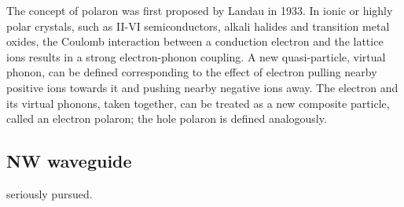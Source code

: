 The concept of polaron was first proposed by Landau in 1933. In ionic or highly polar crystals, such as II-VI semiconductors, alkali halides and transition metal oxides, the Coulomb interaction between a conduction electron and the lattice ions results in a strong electron-phonon coupling. A new quasi-particle, virtual phonon, can be defined corresponding to the effect of electron pulling nearby positive ions towards it and pushing nearby negative ions away. The electron and its virtual phonons, taken together, can be treated as a new composite particle, called an electron polaron; the hole polaron is defined analogously. \cite{Devreese1996}

\subsection{NW waveguide}

seriously pursued. 